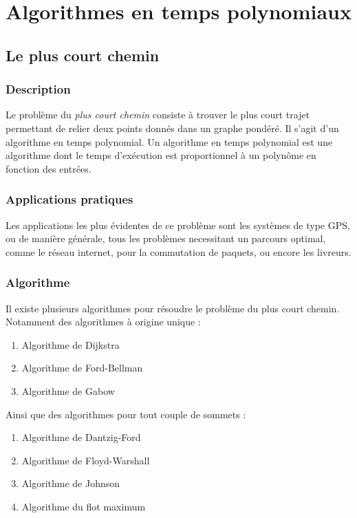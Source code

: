 \section{Algorithmes en temps polynomiaux}
    \subsection{Le plus court chemin}
        \subsubsection{Description}
        Le problème du \emph{plus court chemin} consiste à trouver
        le plus court trajet permettant de relier deux points donnés dans un graphe pondéré. 
	Il s'agit d'un algorithme en temps polynomial. Un algorithme en temps polynomial est 
	une algorithme dont le temps d'exécution est proportionnel à un polynôme en fonction des entrées.
	
        \subsubsection{Applications pratiques}
            Les applications les plus évidentes de ce problème sont les systèmes de type
            GPS, ou de manière générale, tous les problèmes necessitant
            un parcours optimal, comme le réseau internet, pour la commutation de
            paquets, ou encore les livreurs.
        \subsubsection{Algorithme} %
	Il existe plusieurs algorithmes pour résoudre le problème du plus court chemin. 
	Notamment des algorithmes à origine unique :
\begin{enumerate}
 \item Algorithme de Dijkstra
 \item Algorithme de Ford-Bellman
 \item Algorithme de Gabow
\end{enumerate}
	Ainsi que des algorithmes pour tout couple de sommets :
\begin{enumerate}
 \item Algorithme de Dantzig-Ford
 \item Algorithme de Floyd-Warshall
 \item Algorithme de Johnson
 \item Algorithme du flot maximum
\end{enumerate}

